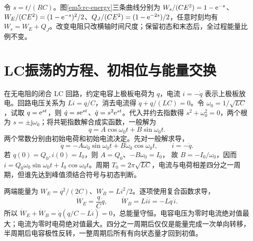 令 $s=t/(RC)$。图\ref{em5:rc-energy}三条曲线分别为 $W_s/(CE^2)=1-\mathrm e^{-s}$、$W_E/(CE^2)=(1-\mathrm e^{-s})^2/2$、$Q_J/(CE^2)=(1-\mathrm e^{-2s})/2$，任意时刻均有 $W_s=W_E+Q_J$。改变电阻只改横轴时间尺度；保留初态和末态后，全过程能量比例不变。


\section{LC振荡的方程、初相位与能量交换}

在无电阻的闭合 LC 回路，约定电容上极板电荷为 $q$，电流 $i=-\dot q$ 表示上极板放电。回路电压关系为 $L\dot i=q/C$，消去电流得 $\ddot q+q/(LC)=0$。令 $\omega_0=1/\sqrt{LC}$，试取 $q=\mathrm e^{st}$，则 $\dot q=s\mathrm e^{st}$、$\ddot q=s^2\mathrm e^{st}$。代入并约去指数得 $s^2+\omega_0^2=0$，两个根为 $s=\pm\mathrm j\omega_0$；将共轭指数解合成实函数，一般解为
\[q=A\cos\omega_0t+B\sin\omega_0t.\]
两个常数分别由初始电荷和初始电流决定。先对一般解求导，
\[
 \dot q=-A\omega_0\sin\omega_0t+B\omega_0\cos\omega_0t,
 \qquad i=-\dot q.
\]
若 $q(0)=Q_0,i(0)=I_0$，则 $A=Q_0$、$-B\omega_0=I_0$，
故 $B=-I_0/\omega_0$，因而 $i=Q_0\omega_0\sin\omega_0t+I_0\cos\omega_0t$。周期 $T_0=2\pi\sqrt{LC}$，电流与电荷相差四分之一周期，但谁先达到峰值须结合符号与初态判断。

两端能量为 $W_E=q^2/(2C)$、$W_B=Li^2/2$。逐项使用复合函数求导，
\[
\dot W_E=\frac qC\dot q,\qquad
\dot W_B=Li\dot i=-L\dot q\,\dot i.
\]
所以 $\dot W_E+\dot W_B=\dot q(q/C-L\dot i)=0$，总能量守恒。电容电压为零时电流绝对值最大；电流为零时电荷绝对值最大。四分之一周期后仅仅是能量完成一次单向转移，半周期后电容极性反转，一整周期后所有有向状态量才回到初值。

